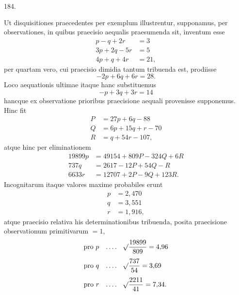 \begin{center}\hypertarget{native-257-article184}{}184.\end{center}
Ut disquisitiones praecedentes per exemplum illustrentur, supponamus,
per observationes, in quibus praecisio aequalis praesumenda sit, inventum esse
\[
\begin{aligned}
p-q+2r&=3\\
3p+2q-5r&=5\\
4p+q+4r&=21,
\end{aligned}
\]
per quartam vero, cui praecisio dimidia tantum tribuenda est, prodiisse
\[
-2p+6q+6r=28.
\]
Loco aequationis ultimae itaque hanc substituemus
\[
-p+3q+3r=14
\]
hancque ex observatione prioribus praecisione aequali provenisse supponemus.
Hinc fit
\[
\begin{aligned}
P&=27p+6q-88\\
Q&=6p+15q+r-70\\
R&=q+54r-107,
\end{aligned}
\]
atque hinc per eliminationem
\[
\begin{aligned}
19899p&=49154+809P-324Q+6R\\
737q&=2617-12P+54Q-R\\
6633r&=12707+2P-9Q+123R.
\end{aligned}
\]
Incognitarum itaque valores maxime probabiles erunt
\[
\begin{aligned}
p&=2{,}470\\
q&=3{,}551\\
r&=1{,}916,
\end{aligned}
\]
atque praecisio relativa his determinationibus tribuenda, posita praecisione
observationum primitivarum $=1$,
\[
\begin{aligned}
\text{pro }p\quad .\,.\,.\,.\quad &\mathord{{}^{}\!\surd}\frac{19899}{809}=4{,}96\\[4pt]
\text{pro }q\quad .\,.\,.\,.\quad &\mathord{{}^{}\!\surd}\frac{737}{54}=3{,}69\\[4pt]
\text{pro }r\quad .\,.\,.\,.\quad &\mathord{{}^{}\!\surd}\frac{2211}{41}=7{,}34.
\end{aligned}
\]
